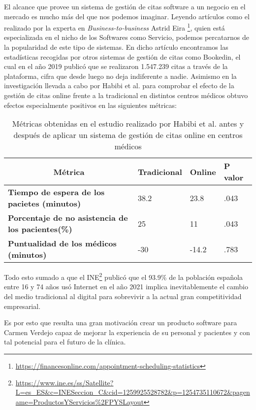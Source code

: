 El alcance que provee un sistema de gestión de citas software a un negocio en el mercado es mucho más del que nos podemos imaginar. Leyendo artículos como el realizado por la experta en \textit{Business-to-business} Astrid Eira \footnote{\url{https://financesonline.com/appointment-scheduling-statistics}}, quien está especializada en el nicho de los Softwares como Servicio, podemos percatarnos de la popularidad de este tipo de sistemas. En dicho artículo encontramos las estadísticas recogidas por otros sistemas de gestión de citas como Bookedin, el cual en el año 2019 publicó que se realizaron 1.547.239 citas a través de la plataforma, cifra que desde luego no deja indiferente a nadie. Asimismo en la investigación llevada a cabo por Habibi et al. \cite{Habibi2019} para comprobar el efecto de la gestión de citas online frente a la tradicional en distintos centros médicos obtuvo efectos especialmente positivos en las siguientes métricas: \bigskip

\begin{table}[H]
\begin{tabular}{llll}
\hline
\multicolumn{1}{c}{\textbf{Métrica}}                      & \textbf{Tradicional} & \textbf{Online} & \textbf{P valor} \\ \hline
\textbf{Tiempo de espera de los pacietes (minutos)}       & 38.2                 & 23.8            & .043             \\
\textbf{Porcentaje de no asistencia de los pacientes(\%)} & 25                   & 11              & .043             \\
\textbf{Puntualidad de los médicos (minutos)}             & -30                  & -14.2           & .783             \\ \hline
\end{tabular}
\caption{Métricas obtenidas en el estudio realizado por Habibi et al. \cite{Habibi2019} antes y después de aplicar un sistema de gestión de citas online en centros médicos}
\label{table:r7000}
\end{table}

Todo esto sumado a que el INE\footnote{\url{https://www.ine.es/ss/Satellite?L=es_ES&c=INESeccion_C&cid=1259925528782&p=1254735110672&pagename=ProductosYServicios\%2FPYSLayout}} publicó que el 93.9\% de la población española entre 16 y 74 años usó Internet en el año 2021 implica inevitablemente el cambio del medio tradicional al digital para sobrevivir a la actual gran competitividad empresarial.\bigskip

Es por esto que resulta una gran motivación crear un producto software para Carmen Verdejo capaz de mejorar la experiencia de su personal y pacientes y con tal potencial para el futuro de la clínica.


